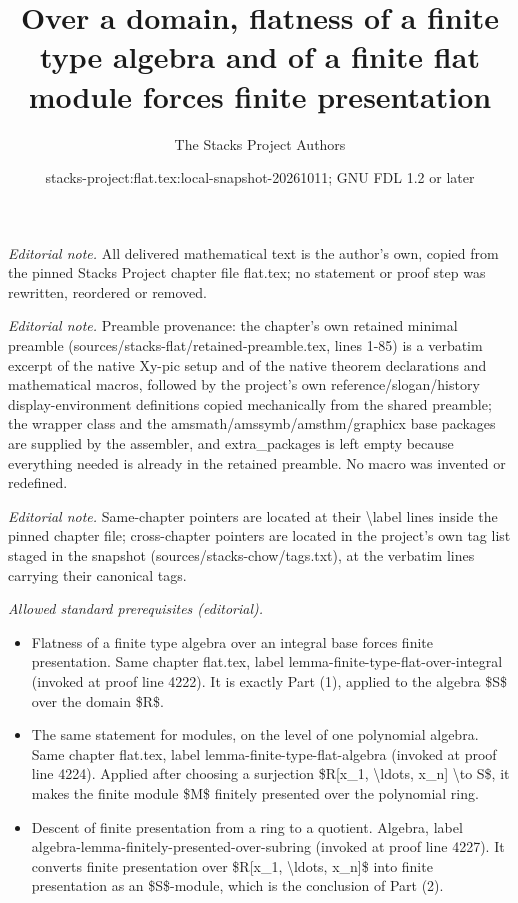 \documentclass[10pt,a4paper]{amsart}
\title{Over a domain, flatness of a finite type algebra and of a finite flat module forces finite presentation}
\author{The Stacks Project Authors}
\date{stacks-project:flat.tex:local-snapshot-20261011; GNU FDL 1.2 or later}
\theoremstyle{plain}
\theoremstyle{definition}
\theoremstyle{remark}
\numberwithin{equation}{subsection}
\begin{document}
\maketitle
\noindent\textit{Editorial note.} All delivered mathematical text is the author's own, copied from the pinned Stacks Project chapter file flat.tex; no statement or proof step was rewritten, reordered or removed.\par\medskip
\noindent\textit{Editorial note.} Preamble provenance: the chapter's own retained minimal preamble (sources/stacks-flat/retained-preamble.tex, lines 1-85) is a verbatim excerpt of the native Xy-pic setup and of the native theorem declarations and mathematical macros, followed by the project's own reference/slogan/history display-environment definitions copied mechanically from the shared preamble; the wrapper class and the amsmath/amssymb/amsthm/graphicx base packages are supplied by the assembler, and extra\_packages is left empty because everything needed is already in the retained preamble. No macro was invented or redefined.\par\medskip
\noindent\textit{Editorial note.} Same-chapter pointers are located at their \textbackslash{}label lines inside the pinned chapter file; cross-chapter pointers are located in the project's own tag list staged in the snapshot (sources/stacks-chow/tags.txt), at the verbatim lines carrying their canonical tags.\par\medskip
\noindent\textit{Allowed standard prerequisites (editorial).}\begin{itemize}
\item Flatness of a finite type algebra over an integral base forces finite presentation. Same chapter flat.tex, label lemma-finite-type-flat-over-integral (invoked at proof line 4222). It is exactly Part (1), applied to the algebra \$S\$ over the domain \$R\$.
\item The same statement for modules, on the level of one polynomial algebra. Same chapter flat.tex, label lemma-finite-type-flat-algebra (invoked at proof line 4224). Applied after choosing a surjection \$R[x\_1, \textbackslash{}ldots, x\_n] \textbackslash{}to S\$, it makes the finite module \$M\$ finitely presented over the polynomial ring.
\item Descent of finite presentation from a ring to a quotient. Algebra, label algebra-lemma-finitely-presented-over-subring (invoked at proof line 4227). It converts finite presentation over \$R[x\_1, \textbackslash{}ldots, x\_n]\$ into finite presentation as an \$S\$-module, which is the conclusion of Part (2).
\end{itemize}\medskip
\end{document}
